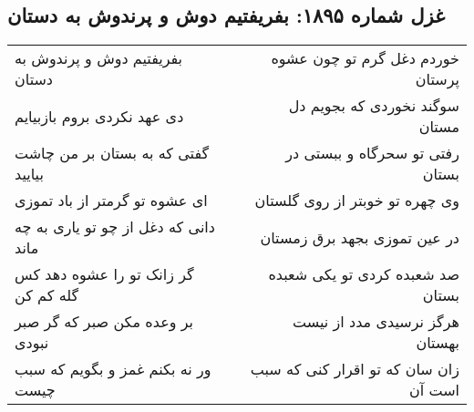 \begin{center}
\section*{غزل شماره ۱۸۹۵: بفریفتیم دوش و پرندوش به دستان}
\label{sec:1895}
\begin{longtable}{l p{0.5cm} r}
بفریفتیم دوش و پرندوش به دستان
&&
خوردم دغل گرم تو چون عشوه پرستان
\\
دی عهد نکردی بروم بازبیایم
&&
سوگند نخوردی که بجویم دل مستان
\\
گفتی که به بستان بر من چاشت بیایید
&&
رفتی تو سحرگاه و ببستی در بستان
\\
ای عشوه تو گرمتر از باد تموزی
&&
وی چهره تو خوبتر از روی گلستان
\\
دانی که دغل از چو تو یاری به چه ماند
&&
در عین تموزی بجهد برق زمستان
\\
گر زانک تو را عشوه دهد کس گله کم کن
&&
صد شعبده کردی تو یکی شعبده بستان
\\
بر وعده مکن صبر که گر صبر نبودی
&&
هرگز نرسیدی مدد از نیست بهستان
\\
ور نه بکنم غمز و بگویم که سبب چیست
&&
زان سان که تو اقرار کنی که سبب است آن
\\
\end{longtable}
\end{center}
